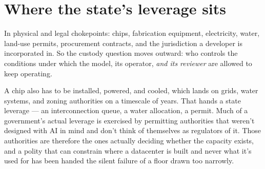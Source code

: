 \section{Where the state's leverage sits}
\label{sec:15.2}
In physical and legal chokepoints: chips, fabrication equipment, electricity, water, land-use permits, procurement contracts, and the jurisdiction a developer is incorporated in.
So the custody question moves outward: who controls the conditions under which the model, its operator, \emph{and its reviewer} are allowed to keep operating.

A chip also has to be installed, powered, and cooled, which lands on grids, water systems, and zoning authorities on a timescale of years. That hands a state leverage — an interconnection queue, a water allocation, a permit. Much of a government's actual leverage is exercised by permitting authorities that weren't designed with AI in mind and don't think of themselves as regulators of it. Those authorities are therefore the ones actually deciding whether the capacity exists, and a polity that can constrain where a datacenter is built and never what it's used for has been handed the silent failure of a floor drawn too narrowly.

